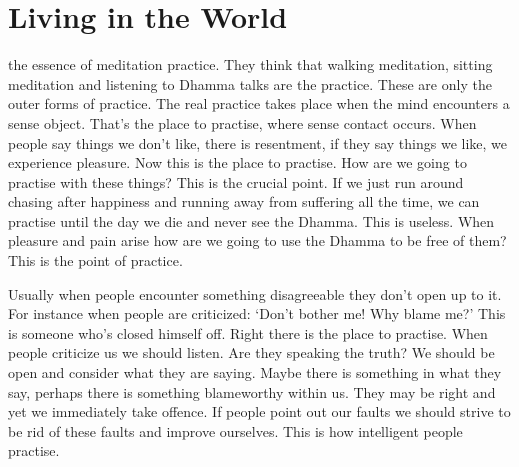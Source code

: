 

\chapter{Living in the World}

 the essence of meditation practice. They think that walking meditation, sitting meditation and listening to Dhamma talks are the practice. These are only the outer forms of practice. The real practice takes place when the mind encounters a sense object. That's the place to practise, where sense contact occurs. When people say things we don't like, there is resentment, if they say things we like, we experience pleasure. Now this is the place to practise. How are we going to practise with these things? This is the crucial point. If we just run around chasing after happiness and running away from suffering all the time, we can practise until the day we die and never see the Dhamma. This is useless. When pleasure and pain arise how are we going to use the Dhamma to be free of them? This is the point of practice.

Usually when people encounter something disagreeable they don't open up to it. For instance when people are criticized: `Don't bother me! Why blame me?' This is someone who's closed himself off. Right there is the place to practise. When people criticize us we should listen. Are they speaking the truth? We should be open and consider what they are saying. Maybe there is something in what they say, perhaps there is something blameworthy within us. They may be right and yet we immediately take offence. If people point out our faults we should strive to be rid of these faults and improve ourselves. This is how intelligent people practise.

